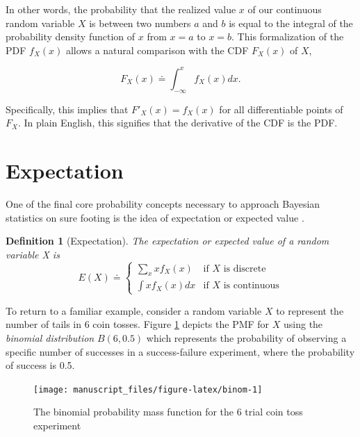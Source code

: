 \documentclass[
  12pt,
  oneside]{book}
\theoremstyle{definition}
\newtheorem{definition}{Definition}[chapter]
\theoremstyle{definition}
\theoremstyle{definition}
\theoremstyle{remark}
\begin{document}
In other words, the probability that the realized value \(x\) of our continuous random variable \(X\) is between two numbers \(a\) and \(b\) is equal to the integral of the probability density function of \(x\) from \(x = a\) to \(x = b\).
This formalization of the PDF \(f_X(x)\) allows a natural comparison with the CDF \(F_X(x)\) of \(X\),

\[F_X(x) \doteq \int_{-\infty}^{x}f_X(x)dx.\]

Specifically, this implies that \(F'_X(x)=f_X(x)\) for all differentiable points of \(F_X\).
In plain English, this signifies that the derivative of the CDF is the PDF.

\hypertarget{expectation}{%
\section{Expectation}\label{expectation}}

One of the final core probability concepts necessary to approach Bayesian statistics on sure footing is the idea of expectation or expected value \citep[  3.1]{Wasserman2004}.

\begin{definition}[Expectation]
\protect\hypertarget{def:e}{}{\label{def:e} {} }\emph{The expectation or expected value of a random variable X is}
\[E(X) \doteq \begin{cases}\sum_{x}xf_{X}(x) & \textrm{if }X\textrm{ is discrete}\\\int{xf_{X}(x)dx} & \textrm{if }X\textrm{ is continuous}\end{cases}\]
\end{definition}

To return to a familiar example, consider a random variable \(X\) to represent the number of tails in 6 coin tosses. Figure \ref{fig:binom} depicts the PMF for \(X\) using the \emph{binomial distribution} \(B(6,0.5)\) which represents the probability of observing a specific number of successes in a success-failure experiment, where the probability of success is 0.5.

\begin{figure}

{\centering \texttt{[image: manuscript\_files/figure-latex/binom-1]} 

}

\caption{The binomial probability mass function for the 6 trial coin toss experiment}\label{fig:binom}
\end{figure}
\end{document}
